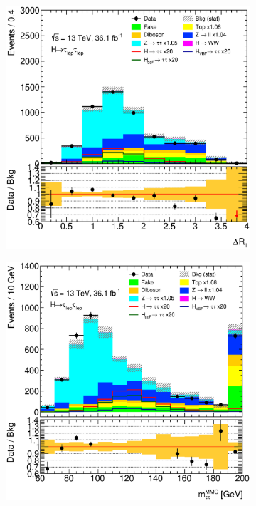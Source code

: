 \begin{figure}[htb]
    \centering
    \begin{subfigure}[t]{0.45\textwidth}
        \includegraphics[width=\textwidth]{./plots/mva/modeling/input_vars/BOOST_SF/ll-CutMVABoostedCatSF-DeltaRLL-lin.eps}
    \end{subfigure}
    \begin{subfigure}[t]{0.45\textwidth}
        \includegraphics[width=\textwidth]{./plots/mva/modeling/input_vars/BOOST_SF/ll-CutMVABoostedCatSF-dilep_mmc_mlm_m-lin.eps}

\end{subfigure}
\end{figure}
